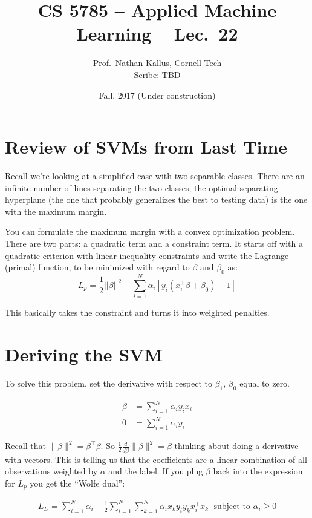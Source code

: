 \documentclass[a4paper]{article}
\title{CS 5785 -- Applied Machine Learning -- Lec.\ 22}
\author{Prof.\ Nathan Kallus, Cornell Tech\\Scribe: TBD}
\date{Fall, 2017 (Under construction)}
\begin{document}
\maketitle
{}

\section{Review of SVMs from Last Time}

Recall we're looking at a simplified case with two separable classes.  There are an infinite number of lines separating the two classes; the optimal separating hyperplane (the one that probably generalizes the best to testing data) is the one with the maximum margin.

You can formulate the maximum margin with a convex optimization problem. There are two parts: a quadratic term and a constraint term.  It starts off with a quadratic criterion with linear inequality constraints and write the Lagrange (primal) function, to be minimized with regard to $\beta$ and $\beta_0$ as:
$$
L_p = \frac{1}{2}||\beta||^2-\sum_{i=1}^N\alpha_i[y_i(x_i^\top\beta+\beta_0)-1]
$$

This basically takes the constraint and turns it into weighted penalties.

\section{Deriving the SVM}

To solve this problem, set the derivative with respect to $\beta_1$, $\beta_0$ equal to zero.

\begin{align}
\beta &= \sum_{i=1}^{N} \alpha_i y_i x_i\\
0 &= \sum_{i=1}^{N} \alpha_i y_i
\end{align}

Recall that $\|\beta\|^2 = \beta^\top \beta$. So $\frac{1}{2} \frac{d}{d\beta} \|\beta\|^2 = \beta$ thinking about doing a derivative with vectors.  This is telling us that the coefficients are a linear combination of all observations weighted by $\alpha$ and the label.  If you plug $\beta$ back into the expression for $L_p$ you get the ``Wolfe dual'':

\begin{align}
L_D = \sum_{i=1}^{N} \alpha_i - \frac{1}{2} \sum_{i=1}^{N} \sum_{k=1}^{N} \alpha_i x_k y_i y_k x_i^\top x_k \;
\text{ subject to } \alpha_i \geq 0
\end{align}
\end{document}
